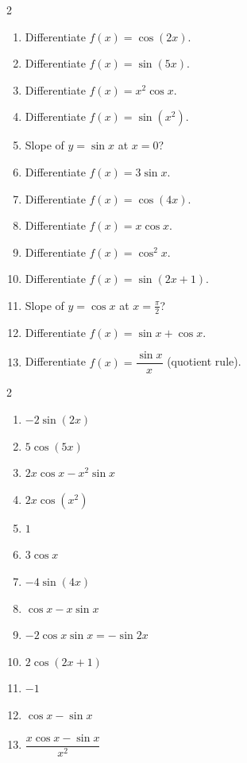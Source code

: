 \documentclass[11pt]{article}
\begin{document}
\begin{recapbox}
\begin{multicols}{2}
\small
\begin{enumerate}[leftmargin=*,itemsep=3pt]
  \item Differentiate $f(x)=\cos(2x)$.
  \item Differentiate $f(x)=\sin(5x)$.
  \item Differentiate $f(x)=x^2\cos x$.
  \item Differentiate $f(x)=\sin(x^2)$.
  \item Slope of $y=\sin x$ at $x=0$?
  \item Differentiate $f(x)=3\sin x$.
  \item Differentiate $f(x)=\cos(4x)$.
  \item Differentiate $f(x)=x\cos x$.
  \item Differentiate $f(x)=\cos^2 x$.
  \item Differentiate $f(x)=\sin(2x+1)$.
  \item Slope of $y=\cos x$ at $x=\tfrac{\pi}{2}$?
  \item Differentiate $f(x)=\sin x+\cos x$.
  \item Differentiate $f(x)=\dfrac{\sin x}{x}$ (quotient rule).
\end{enumerate}
\end{multicols}
\end{recapbox}

\begin{keybox}
\begin{multicols}{2}
\small
\begin{enumerate}[leftmargin=*,itemsep=3pt]
  \item $-2\sin(2x)$
  \item $5\cos(5x)$
  \item $2x\cos x-x^2\sin x$
  \item $2x\cos(x^2)$
  \item $1$
  \item $3\cos x$
  \item $-4\sin(4x)$
  \item $\cos x-x\sin x$
  \item $-2\cos x\sin x=-\sin 2x$
  \item $2\cos(2x+1)$
  \item $-1$
  \item $\cos x-\sin x$
  \item $\dfrac{x\cos x-\sin x}{x^2}$
\end{enumerate}
\end{multicols}
\end{keybox}
\end{document}
